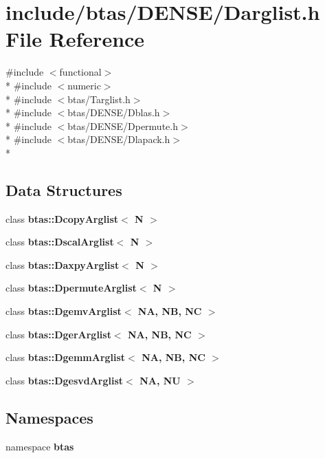 \section{include/btas/\-D\-E\-N\-S\-E/\-Darglist.h File Reference}
\label{d4/d22/Darglist_8h}
{\ttfamily \#include $<$functional$>$}\\*
{\ttfamily \#include $<$numeric$>$}\\*
{\ttfamily \#include $<$btas/\-Targlist.\-h$>$}\\*
{\ttfamily \#include $<$btas/\-D\-E\-N\-S\-E/\-Dblas.\-h$>$}\\*
{\ttfamily \#include $<$btas/\-D\-E\-N\-S\-E/\-Dpermute.\-h$>$}\\*
{\ttfamily \#include $<$btas/\-D\-E\-N\-S\-E/\-Dlapack.\-h$>$}\\*
\subsection*{Data Structures}
\begin{DoxyCompactItemize}
\item 
class {\bf btas\-::\-Dcopy\-Arglist$<$ N $>$}
\item 
class {\bf btas\-::\-Dscal\-Arglist$<$ N $>$}
\item 
class {\bf btas\-::\-Daxpy\-Arglist$<$ N $>$}
\item 
class {\bf btas\-::\-Dpermute\-Arglist$<$ N $>$}
\item 
class {\bf btas\-::\-Dgemv\-Arglist$<$ N\-A, N\-B, N\-C $>$}
\item 
class {\bf btas\-::\-Dger\-Arglist$<$ N\-A, N\-B, N\-C $>$}
\item 
class {\bf btas\-::\-Dgemm\-Arglist$<$ N\-A, N\-B, N\-C $>$}
\item 
class {\bf btas\-::\-Dgesvd\-Arglist$<$ N\-A, N\-U $>$}
\end{DoxyCompactItemize}
\subsection*{Namespaces}
\begin{DoxyCompactItemize}
\item 
namespace {\bf btas}
\end{DoxyCompactItemize}
